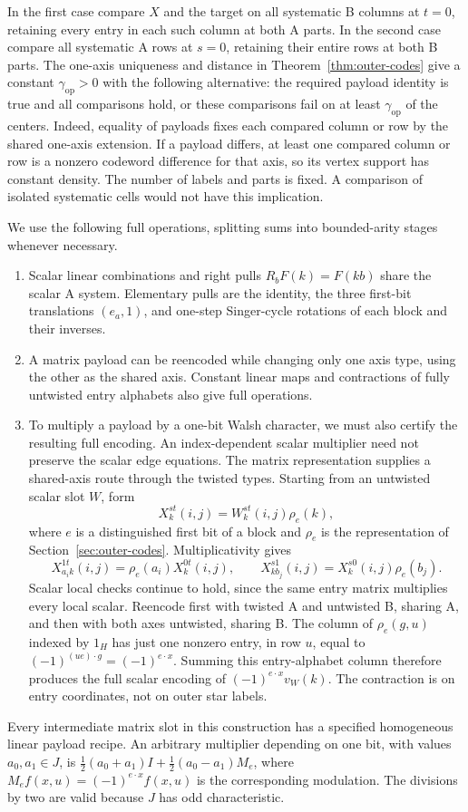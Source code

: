 In the first case compare $X$ and the target on all systematic B columns
at $t=0$, retaining every entry in each such column at both A parts.
In the second case compare all systematic A rows at $s=0$, retaining
their entire rows at both B parts.  The one-axis uniqueness and distance
in Theorem~\ref{thm:outer-codes} give a constant $\gamma_{\mathrm{op}}>0$
with the following alternative: the required payload identity is true
and all comparisons hold, or these comparisons fail on at least
$\gamma_{\mathrm{op}}$ of the centers.  Indeed, equality of payloads
fixes each compared column or row by the shared one-axis extension.
If a payload differs, at least one compared column or row is a nonzero
codeword difference for that axis, so its vertex support has constant
density.  The number of labels and parts is fixed.  A comparison of
isolated systematic cells would not have this implication.

We use the following full operations, splitting sums into bounded-arity
stages whenever necessary.
\begin{enumerate}[label=(\roman*)]
\item Scalar linear combinations and right pulls
$R_bF(k)=F(kb)$ share the scalar A system.  Elementary pulls are the
identity, the three first-bit translations $(e_a,1)$, and one-step
Singer-cycle rotations of each block and their inverses.
\item A matrix payload can be reencoded while changing only one axis
type, using the other as the shared axis.  Constant linear maps and
contractions of fully untwisted entry alphabets also give full operations.
\item To multiply a payload by a one-bit Walsh character, we must also
certify the resulting full encoding. An index-dependent scalar
multiplier need not preserve the scalar edge equations. The matrix
representation supplies a shared-axis route through the twisted types.
Starting from an untwisted scalar slot $W$, form
\[
             X^{st}_k(i,j)=W^{st}_k(i,j)\rho_e(k),
\]
where $e$ is a distinguished first bit of a block and $\rho_e$ is the
representation of Section~\ref{sec:outer-codes}.  Multiplicativity gives
\[
 X^{1t}_{a_i k}(i,j)=\rho_e(a_i)X^{0t}_k(i,j),\qquad
 X^{s1}_{k b_j}(i,j)=X^{s0}_k(i,j)\rho_e(b_j).
\]
Scalar local checks continue to hold, since the same entry matrix
multiplies every local scalar.  Reencode first with twisted A and
untwisted B, sharing A, and then with both axes untwisted, sharing B.
The column of $\rho_e(g,u)$ indexed by $1_H$ has just one nonzero entry,
in row $u$, equal to
$(-1)^{(ue)\cdot g}=(-1)^{e\cdot x}$.
Summing this entry-alphabet column therefore produces the full scalar
encoding of $(-1)^{e\cdot x}v_W(k)$.  The contraction is on entry
coordinates, not on outer star labels.
\end{enumerate}
Every intermediate matrix slot in this construction has a specified
homogeneous linear payload recipe.  An arbitrary multiplier depending
on one bit, with values $a_0,a_1\in J$, is
$\frac12(a_0+a_1)I+\frac12(a_0-a_1)M_e$, where
$M_ef(x,u)=(-1)^{e\cdot x}f(x,u)$ is the corresponding modulation.
The divisions by two are valid because $J$ has odd characteristic.

